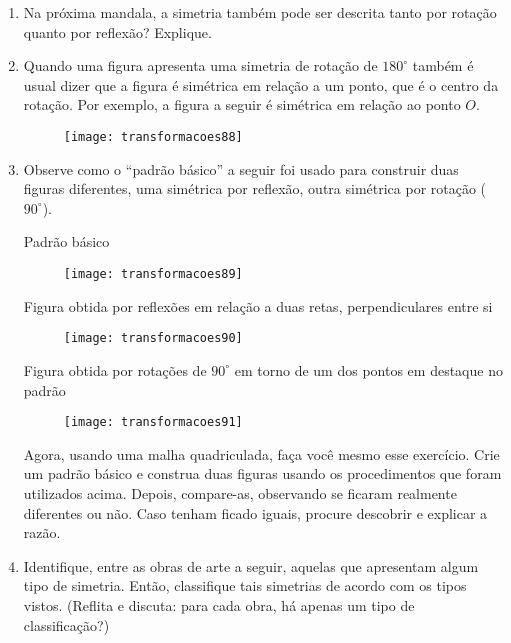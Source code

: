 \begin{enumerate}
\item Na próxima mandala, a simetria também pode ser descrita tanto por rotação quanto por reflexão? Explique. 

 

\item Quando uma figura apresenta uma simetria de rotação de $180^{\circ}$ também é usual dizer que a figura é simétrica em relação a um ponto, que é o centro da rotação. Por exemplo, a figura a seguir é simétrica em relação ao ponto $O$. 

\begin{figure}[H]
\centering

\texttt{[image: transformacoes88]}
\end{figure}


\item Observe como o “padrão básico” a seguir foi usado para construir duas figuras diferentes, uma simétrica por reflexão, outra simétrica por rotação ($90^{\circ}$). 

Padrão básico
 
\begin{figure}[H]
\centering

\texttt{[image: transformacoes89]}
\end{figure}

Figura obtida por reflexões em relação a duas retas, perpendiculares entre si

\begin{figure}[H]
\centering

\texttt{[image: transformacoes90]}
\end{figure}

 
Figura obtida por rotações de $90^{\circ}$ em torno de um dos pontos em destaque no padrão

\begin{figure}[H]
\centering

\texttt{[image: transformacoes91]}
\end{figure}
 

Agora, usando uma malha quadriculada, faça você mesmo esse exercício. Crie um padrão básico e construa duas figuras usando os procedimentos que foram utilizados acima. Depois, compare-as, observando se ficaram realmente diferentes ou não. Caso tenham ficado iguais, procure descobrir e explicar a razão. 


\item Identifique, entre as obras de arte a seguir, aquelas que apresentam algum tipo de simetria. Então, classifique tais simetrias de acordo com os tipos vistos. (Reflita e discuta: para cada obra, há apenas um tipo de classificação?)


\end{enumerate}
